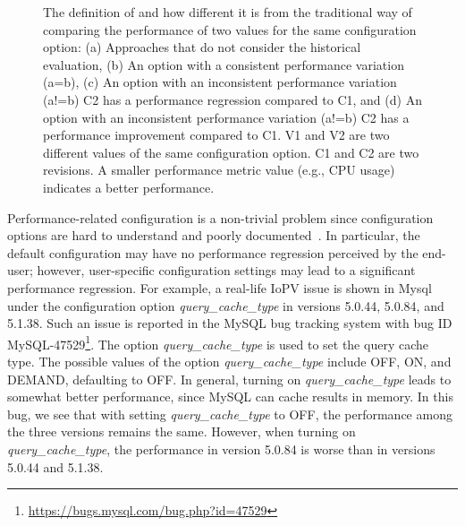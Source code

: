 \begin{figure}[t]
{	The definition of \inconsistent and how different it is from the traditional way of comparing the performance of two values for the same configuration option: (a) Approaches that do not consider the historical evaluation, (b) An option with a consistent performance variation (a=b), (c) An option with an inconsistent performance variation (a!=b) C2 has a performance regression compared to C1, and (d) An option with an inconsistent performance variation (a!=b) C2 has a performance improvement compared to C1. V1 and V2 are two different values of the same configuration option. C1 and C2 are two revisions. A smaller performance metric value (e.g., CPU usage) indicates a better performance.
	}
	\label{fig:description}
\end{figure}


Performance-related configuration is a non-trivial problem since configuration options are hard to understand and poorly documented~\cite{DBLP:conf/eurosys/LiWHL20}. In particular, the default configuration may have no performance regression perceived by the end-user; however, user-specific configuration settings may lead to a significant performance regression.
For example, a real-life IoPV issue is shown in Mysql under the configuration option \emph{query\_cache\_type} in versions 5.0.44, 5.0.84, and 5.1.38. Such an issue is reported in the MySQL bug tracking system with bug ID MySQL-47529\footnote{\url{https://bugs.mysql.com/bug.php?id=47529}}. The option \emph{query\_cache\_type} is used to set the query cache type. The possible values of the option \emph{query\_cache\_type} include OFF, ON, and DEMAND, defaulting to OFF. In general, turning on \emph{query\_cache\_type} leads to somewhat better performance, since MySQL can cache results in memory. In this bug, we see that with setting  \emph{query\_cache\_type} to OFF, the performance among the three versions remains the same. However, when turning on \emph{query\_cache\_type}, the performance in version 5.0.84 is worse than in versions 5.0.44 and 5.1.38.

